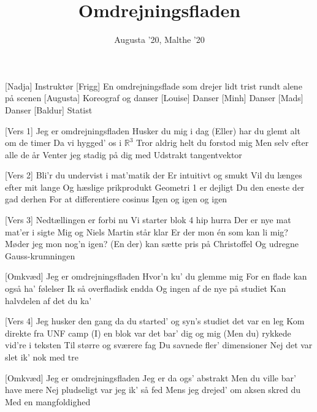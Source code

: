 \documentclass[a4paper, 11pt]{article}
\title{Omdrejningsfladen}
\author{Augusta '20, Malthe '20}
\begin{document}
\maketitle

\begin{roles} 
[Nadja] Instruktør
[Frigg] En omdrejningsflade som drejer lidt trist rundt alene på scenen
[Augusta] Koreograf og danser
[Louise] Danser
[Minh] Danser
[Mads] Danser
[Baldur] Statist
\end{roles}

\begin{song}
[Vers 1] Jeg er omdrejningsfladen 
Husker du mig i dag
(Eller) har du glemt alt om de timer 
Da vi hygged’ os i $\mathbb{R}^3$ 
Tror aldrig helt du forstod mig
Men selv efter alle de år 
Venter jeg stadig på dig med
Udstrakt tangentvektor 

[Vers 2] Bli’r du undervist i mat’matik der 
Er intuitivt og smukt 
Vil du længes efter mit lange 
Og hæslige prikprodukt  
Geometri 1 er dejligt 
Du den eneste der gad derhen 
For at differentiere cosinus
Igen og igen og igen 

[Vers 3] Nedtællingen er forbi nu 
Vi starter blok 4 hip hurra 
Der er nye mat mat’er i sigte 
Mig og Niels Martin står klar
Er der mon én som kan li mig? 
Møder jeg mon nog'n igen?
(En der) kan sætte pris på Christoffel 
Og udregne Gauss-krumningen

[Omkvæd] Jeg er omdrejningsfladen 
Hvor'n ku' du glemme mig 
For en flade kan også ha' følelser 
Ik så overfladisk endda 
Og ingen af de nye på studiet 
Kan halvdelen af det du ka'

[Vers 4] Jeg husker den gang da du started'
og syn's studiet det var en leg
Kom direkte fra UNF camp 
(I) en blok var det bar' dig og mig   
(Men du) rykkede vid're i teksten 
Til større og sværere fag 
Du savnede fler' dimensioner 
Nej det var slet ik' nok med tre

[Omkvæd] Jeg er omdrejningsfladen 
Jeg er da ogs' abstrakt
Men du ville bar' have mere
Nej pludseligt var jeg ik' så fed
Mens jeg drejed' om aksen skred du 
Med en mangfoldighed

\end{song}
\end{document}
